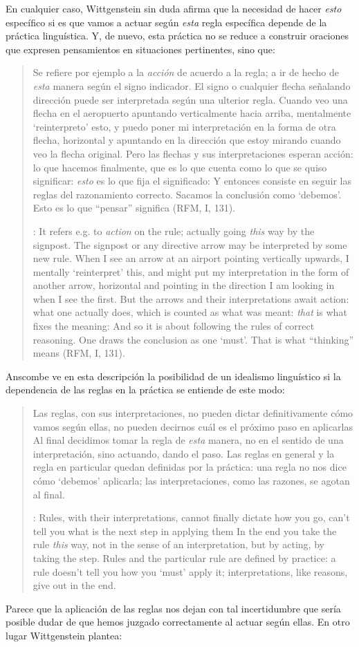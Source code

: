 En cualquier caso, Wittgenstein sin duda afirma que la necesidad de hacer \emph{esto} específico si es que vamos a actuar según \emph{esta} regla específica depende de la práctica linguística. Y, de nuevo, esta práctica no se reduce a construir oraciones que expresen pensamientos en situaciones pertinentes, sino que: \blockquote[{\cite[131]{anscombe1981parmenides:qli}}: It refers e.g. to \emph{action} on the rule; actually going \emph{this} way by the signpost. The signpost or any directive arrow may be interpreted by some new rule. When I see an arrow at an airport pointing vertically upwards, I mentally `reinterpret' this, and might put my interpretation in the form of another arrow, horizontal and pointing in the direction I am looking in when I see the first. But the arrows and their interpretations await action: what one actually does, which is counted as what was meant: \emph{that} is what fixes the meaning: And so it is about following the rules of correct reasoning. One draws the conclusion as one `must'. That is what ``thinking'' means (RFM, I, 131).]{Se refiere por ejemplo a la \emph{acción} de acuerdo a la regla; a ir de hecho de \emph{esta} manera según el signo indicador. El signo o cualquier flecha señalando dirección puede ser interpretada según una ulterior regla. Cuando veo una flecha en el aeropuerto apuntando verticalmente hacia arriba, mentalmente `reinterpreto' esto, y puedo poner mi interpretación en la forma de otra flecha, horizontal y apuntando en la dirección que estoy mirando cuando veo la flecha original. Pero las flechas y sus interpretaciones esperan acción: lo que hacemos finalmente, que es lo que cuenta como lo que se quiso significar: \emph{esto} es lo que fija el significado: Y entonces consiste en seguir las reglas del razonamiento correcto. Sacamos la conclusión como `debemos'. Esto es lo que ``pensar'' significa (RFM, I, 131).} Anscombe ve en esta descripción la posibilidad de un idealismo linguístico si la dependencia de las reglas en la práctica se entiende de este modo: \blockquote[{\cite[131]{anscombe1981parmenides:qli}}: Rules, with their interpretations, cannot finally dictate how you go, can't tell you what is the next step in applying them \textelp{} In the end you take the rule \emph{this} way, not in the sense of an interpretation, but by acting, by taking the step. Rules and the particular rule are defined by practice: a rule doesn't tell you how you `must' apply it; interpretations, like reasons, give out in the end.]{Las reglas, con sus interpretaciones, no pueden dictar definitivamente cómo vamos según ellas, no pueden decirnos cuál es el próximo paso en aplicarlas \textelp{} Al final decidimos tomar la regla de \emph{esta} manera, no en el sentido de una interpretación, sino actuando, dando el paso. Las reglas en general y la regla en particular quedan definidas por la práctica: una regla no nos dice cómo `debemos' aplicarla; las interpretaciones, como las razones, se agotan al final.} Parece que la aplicación de las reglas nos dejan con tal incertidumbre que sería posible dudar de que hemos juzgado correctamente al actuar según ellas. En otro lugar Wittgenstein plantea:

